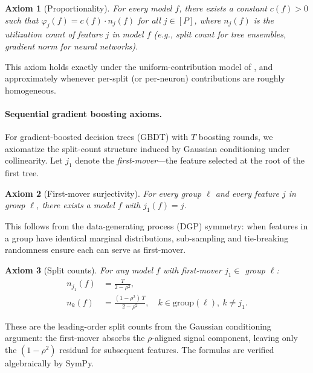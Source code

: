 \documentclass{article}
\newtheorem{axiom}{Axiom}
\newcommand{\GBDT}{\textsc{GBDT}}
\begin{document}
\begin{axiom}[Proportionality]
\label{ax:proportional}
For every model $f$, there exists a constant $c(f) > 0$ such that $\varphi_j(f) = c(f) \cdot n_j(f)$ for all $j \in [P]$, where $n_j(f)$ is the utilization count of feature $j$ in model $f$ (e.g., split count for tree ensembles, gradient norm for neural networks).
\end{axiom}

This axiom holds exactly under the uniform-contribution model of \citep{lundberg2017unified}, and approximately whenever per-split (or per-neuron) contributions are roughly homogeneous.

\paragraph{Sequential gradient boosting axioms.}
For gradient-boosted decision trees (\GBDT{}) with $T$ boosting rounds, we axiomatize the split-count structure induced by Gaussian conditioning under collinearity.
Let $j_1$ denote the \emph{first-mover}---the feature selected at the root of the first tree.

\begin{axiom}[First-mover surjectivity]
\label{ax:surjective}
For every group $\ell$ and every feature $j$ in group $\ell$, there exists a model $f$ with $j_1(f) = j$.
\end{axiom}

This follows from the data-generating process (DGP) symmetry: when features in a group have identical marginal distributions, sub-sampling and tie-breaking randomness ensure each can serve as first-mover.

\begin{axiom}[Split counts]
\label{ax:splits}
For any model $f$ with first-mover $j_1 \in$ group $\ell$:
\begin{align}
    n_{j_1}(f) &= \frac{T}{2 - \rho^2}, \label{eq:splits-first} \\
    n_{k}(f) &= \frac{(1-\rho^2)\,T}{2 - \rho^2}, \quad k \in \text{group}(\ell),\ k \neq j_1. \label{eq:splits-other}
\end{align}
\end{axiom}

These are the leading-order split counts from the Gaussian conditioning argument: the first-mover absorbs the $\rho$-aligned signal component, leaving only the $(1-\rho^2)$ residual for subsequent features.
The formulas are verified algebraically by SymPy.
\end{document}
